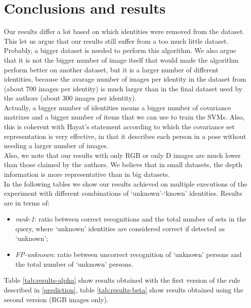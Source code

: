 \documentclass{article}
\begin{document}
\section{Conclusions and results}
Our results differ a lot based on which identities were removed from the
dataset.
\\
This let us argue that our results still suffer from a too much little dataset.
Probably, a bigger dataset is needed to perform this algorithm. We also argue
that it is not the bigger number of image itself that would made the algorithm
perform better on another dataset, but it is a larger number of different
identities, because the avarage number of images per identity in the dataset
from \citep{Fanelli2013} (about 700 images per identity) is much larger than in
the final dataset used by the authors (about 300 images per identity).
\\
Actually, a bigger number of identities means a bigger number of covariance
matrixes and a bigger number of items that we can use to train the SVMs. Also,
this is coherent with Hayat's statement according to which the covariance set
representation is very effective, in that it describes each person in a pose
without needing a larger number of images.
\\
Also, we note that our results with only RGB or only D images are much lower
than those claimed by the authors. We believe that in small datasets, the depth
information is more representative than in big datasets.
\\
In the following tables we show our results achieved on multiple executions of
the experiment with different combinations of `unknown'-`known' identities.
Results are in terms of:
\begin{itemize}
	\item \textit{rank-1}: ratio between correct recognitions and the total
		number of sets in the query, where `unknown' identities are
		considered correct if detected as `unknown';
	\item \textit{FP-unknown}: ratio between uncorrect recognition of
		`unknown' persons and the total number of `unknown' persons.
\end{itemize}
Table \ref{tab:results-alpha} show results obtained with the first version of
the rule described in \ref{prediction}, table \ref{tab:results-beta} show
results obtained using the second version (RGB images only).
\end{document}
